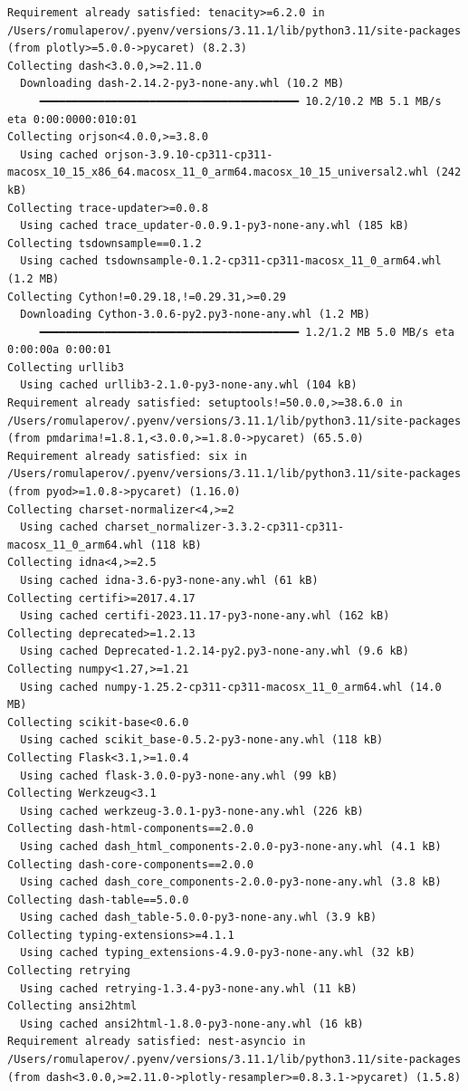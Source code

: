\documentclass[
  letterpaper,
  DIV=11,
  numbers=noendperiod]{scrartcl}
\begin{document}
\begin{verbatim}
Requirement already satisfied: tenacity>=6.2.0 in /Users/romulaperov/.pyenv/versions/3.11.1/lib/python3.11/site-packages (from plotly>=5.0.0->pycaret) (8.2.3)
Collecting dash<3.0.0,>=2.11.0
  Downloading dash-2.14.2-py3-none-any.whl (10.2 MB)
     ━━━━━━━━━━━━━━━━━━━━━━━━━━━━━━━━━━━━━━━━ 10.2/10.2 MB 5.1 MB/s eta 0:00:0000:010:01
Collecting orjson<4.0.0,>=3.8.0
  Using cached orjson-3.9.10-cp311-cp311-macosx_10_15_x86_64.macosx_11_0_arm64.macosx_10_15_universal2.whl (242 kB)
Collecting trace-updater>=0.0.8
  Using cached trace_updater-0.0.9.1-py3-none-any.whl (185 kB)
Collecting tsdownsample==0.1.2
  Using cached tsdownsample-0.1.2-cp311-cp311-macosx_11_0_arm64.whl (1.2 MB)
Collecting Cython!=0.29.18,!=0.29.31,>=0.29
  Downloading Cython-3.0.6-py2.py3-none-any.whl (1.2 MB)
     ━━━━━━━━━━━━━━━━━━━━━━━━━━━━━━━━━━━━━━━━ 1.2/1.2 MB 5.0 MB/s eta 0:00:00a 0:00:01
Collecting urllib3
  Using cached urllib3-2.1.0-py3-none-any.whl (104 kB)
Requirement already satisfied: setuptools!=50.0.0,>=38.6.0 in /Users/romulaperov/.pyenv/versions/3.11.1/lib/python3.11/site-packages (from pmdarima!=1.8.1,<3.0.0,>=1.8.0->pycaret) (65.5.0)
Requirement already satisfied: six in /Users/romulaperov/.pyenv/versions/3.11.1/lib/python3.11/site-packages (from pyod>=1.0.8->pycaret) (1.16.0)
Collecting charset-normalizer<4,>=2
  Using cached charset_normalizer-3.3.2-cp311-cp311-macosx_11_0_arm64.whl (118 kB)
Collecting idna<4,>=2.5
  Using cached idna-3.6-py3-none-any.whl (61 kB)
Collecting certifi>=2017.4.17
  Using cached certifi-2023.11.17-py3-none-any.whl (162 kB)
Collecting deprecated>=1.2.13
  Using cached Deprecated-1.2.14-py2.py3-none-any.whl (9.6 kB)
Collecting numpy<1.27,>=1.21
  Using cached numpy-1.25.2-cp311-cp311-macosx_11_0_arm64.whl (14.0 MB)
Collecting scikit-base<0.6.0
  Using cached scikit_base-0.5.2-py3-none-any.whl (118 kB)
Collecting Flask<3.1,>=1.0.4
  Using cached flask-3.0.0-py3-none-any.whl (99 kB)
Collecting Werkzeug<3.1
  Using cached werkzeug-3.0.1-py3-none-any.whl (226 kB)
Collecting dash-html-components==2.0.0
  Using cached dash_html_components-2.0.0-py3-none-any.whl (4.1 kB)
Collecting dash-core-components==2.0.0
  Using cached dash_core_components-2.0.0-py3-none-any.whl (3.8 kB)
Collecting dash-table==5.0.0
  Using cached dash_table-5.0.0-py3-none-any.whl (3.9 kB)
Collecting typing-extensions>=4.1.1
  Using cached typing_extensions-4.9.0-py3-none-any.whl (32 kB)
Collecting retrying
  Using cached retrying-1.3.4-py3-none-any.whl (11 kB)
Collecting ansi2html
  Using cached ansi2html-1.8.0-py3-none-any.whl (16 kB)
Requirement already satisfied: nest-asyncio in /Users/romulaperov/.pyenv/versions/3.11.1/lib/python3.11/site-packages (from dash<3.0.0,>=2.11.0->plotly-resampler>=0.8.3.1->pycaret) (1.5.8)

\end{verbatim}
\end{document}
